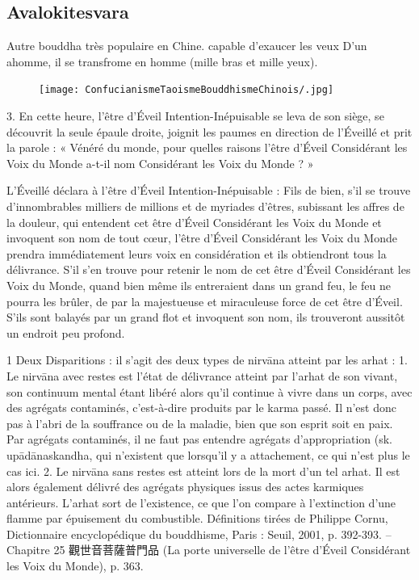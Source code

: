 \subsection{Avalokitesvara} Autre bouddha très populaire en Chine. capable d'exaucer les veux D'un ahomme, il se transfrome en homme (mille bras et mille yeux). 

\begin{figure}
    \centering
        \texttt{[image: ConfucianismeTaoismeBouddhismeChinois/.jpg]}

    \label{fig:enter-label}
\end{figure}


\begin{singlequote}
    3.	En cette heure, l’être d’Éveil Intention-Inépuisable se leva de son siège, se découvrit la seule épaule droite, joignit les paumes en direction de l’Éveillé et prit la parole : « Vénéré du monde, pour quelles raisons l’être d’Éveil Considérant les Voix du Monde a-t-il nom Considérant les Voix du Monde ? »

L’Éveillé déclara à l’être d’Éveil Intention-Inépuisable :
Fils de bien, s’il se trouve d’innombrables milliers de millions et de myriades d’êtres, subissant les affres de la douleur, qui entendent cet être d’Éveil Considérant les Voix du Monde et invoquent son nom de tout cœur, l’être d’Éveil Considérant les Voix du Monde prendra immédiatement leurs voix en considération et ils obtiendront tous la délivrance. S’il s’en trouve pour retenir le nom de cet être d’Éveil Considérant les Voix du Monde, quand bien même ils entreraient dans un grand feu, le feu ne pourra les brûler, de par la majestueuse et miraculeuse force de cet être d’Éveil.
S’ils sont balayés par un grand flot et invoquent son nom, ils trouveront aussitôt un endroit peu profond.


1 Deux Disparitions : il s’agit des deux types de nirvāna atteint par les arhat : 1. Le nirvāna avec restes est l’état de délivrance atteint par l’arhat de son vivant, son continuum mental étant libéré alors qu’il continue à vivre dans un corps, avec des agrégats contaminés, c’est-à-dire produits par le karma passé. Il n’est donc pas à l’abri de la souffrance ou de la maladie, bien que son esprit soit en paix. Par agrégats contaminés, il ne faut pas entendre agrégats d’appropriation (sk. upādānaskandha, qui n’existent que lorsqu’il y a attachement, ce qui n’est plus le cas ici. 2. Le nirvāna sans restes est atteint lors de la mort d’un tel arhat. Il est alors également délivré des agrégats physiques issus des actes karmiques antérieurs. L’arhat sort de l’existence, ce que l’on compare à l’extinction d’une flamme par épuisement du combustible. Définitions tirées de Philippe Cornu, Dictionnaire encyclopédique du bouddhisme, Paris : Seuil, 2001, p. 392-393.
-- Chapitre 25 觀世音菩薩普門品 (La porte universelle de l’être d’Éveil Considérant les
Voix du Monde), p. 363.
\end{singlequote}


